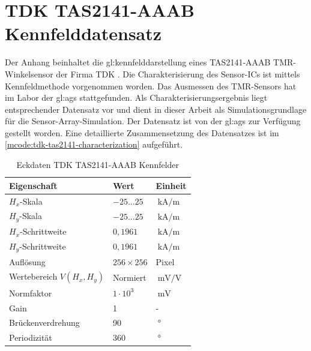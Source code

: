 %

\chapter{TDK TAS2141-AAAB Kennfelddatensatz}\label{ch:tdk-datensatz}

Der Anhang beinhaltet die \gls{gl:kennfeld}darstellung eines TAS2141-AAAB TMR-Winkelsensor der Firma TDK \cite{TDK2016}. Die Charakterisierung des Sensor-ICs ist mittels Kennfeldmethode \cite{Schuethe2019} vorgenommen worden. Das Ausmessen des TMR-Sensors hat im Labor der \gls{gl:ags} stattgefunden. Als Charakterisierungsergebnis liegt entsprechender Datensatz vor und dient in dieser Arbeit als Simulationsgrundlage für die Sensor-Array-Simulation. Der Datensatz ist von der \gls{gl:ags} zur Verfügung gestellt worden. Eine detaillierte Zusammensetzung des Datensatzes ist im \autoref{mcode:tdk-tas2141-characterization} aufgeführt.


\vspace{5mm}
\begin{table}[!htbp]
	\centering
	\begin{tabular}{l l l}
		\toprule
		\textbf{Eigenschaft}      & \textbf{Wert}    & \textbf{Einheit}                \\ \midrule
		$H_x$-Skala               & $-25 \ldots 25$  & $\SI{}{\kilo\ampere\per\metre}$ \\
		$H_y$-Skala               & $-25 \ldots 25$  & $\SI{}{\kilo\ampere\per\metre}$ \\ \hline
		$H_x$-Schrittweite        & $0,1961$         & $\SI{}{\kilo\ampere\per\metre}$ \\
		$H_y$-Schrittweite        & $0,1961$         & $\SI{}{\kilo\ampere\per\metre}$ \\ \hline
		Auflösung                 & $256 \times 256$ & Pixel                           \\
		Wertebereich $V(H_x,H_y)$ & Normiert         & $\SI{}{\milli\volt\per\volt}$   \\ \hline
		Normfaktor                & $1\cdot 10^3$    & $\SI{}{\milli\volt}$            \\
		Gain                      & 1                & -                               \\ \hline
		Brückenverdrehung         & 90               & $\SI{}{\degree}$                \\
		Periodizität              & 360              & $\SI{}{\degree}$                \\ \bottomrule
	\end{tabular}%
	\caption[Eckdaten TDK TAS2141-AAAB Kennfelder]{Eckdaten TDK TAS2141-AAAB Kennfelder}
\label{tab:tdk-char-data}
\end{table}


